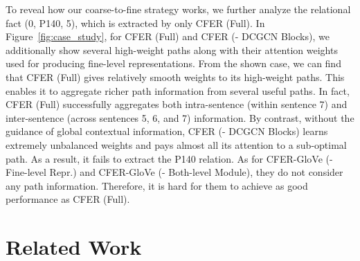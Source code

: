 \documentclass[letterpaper]{article} \usepackage{aaai21}  \usepackage{times}  \usepackage{helvet} \usepackage{courier}  \usepackage[hyphens]{url}  \usepackage{graphicx} \urlstyle{rm} \def\UrlFont{\rm}  \usepackage{natbib}  \usepackage{caption} \frenchspacing  \setlength{\pdfpagewidth}{8.5in}  \setlength{\pdfpageheight}{11in}
\begin{document}
To reveal how our coarse-to-fine strategy works, we further analyze the relational fact (0, P140, 5), which is extracted by only CFER (Full). 
In Figure~\ref{fig:case_study}, for CFER (Full) and CFER (- DCGCN Blocks), we additionally show several high-weight paths along with their attention weights used for producing fine-level representations. 
From the shown case, we can find that CFER (Full) gives relatively smooth weights to its high-weight paths. 
This enables it to aggregate richer path information from several useful paths. 
In fact, CFER (Full) successfully aggregates both intra-sentence (within sentence 7) and inter-sentence (across sentences 5, 6, and 7) information. 
By contrast, without the guidance of global contextual information, CFER (- DCGCN Blocks) learns extremely unbalanced weights and pays almost all its attention to a sub-optimal path. 
As a result, it fails to extract the P140 relation. 
As for CFER-GloVe (- Fine-level Repr.) and CFER-GloVe (- Both-level Module), they do not consider any path information. 
Therefore, it is hard for them to achieve as good performance as CFER (Full). 

\section{Related Work}
\end{document}
